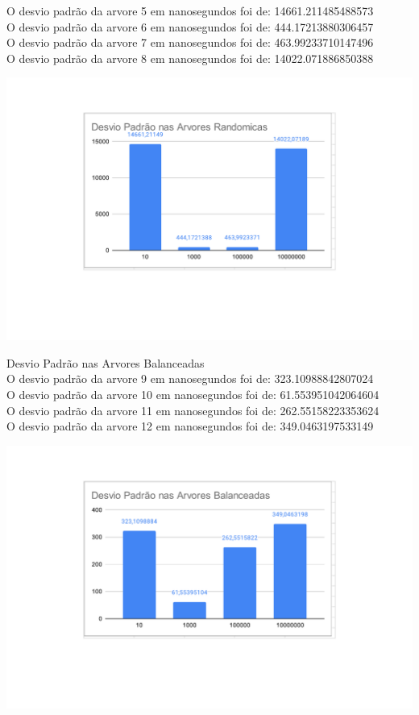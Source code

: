 O desvio padrão da arvore 5 em nanosegundos foi de: 14661.211485488573\\
O desvio padrão da arvore 6 em nanosegundos foi de: 444.17213880306457\\
O desvio padrão da arvore 7 em nanosegundos foi de: 463.99233710147496\\
O desvio padrão da arvore 8 em nanosegundos foi de: 14022.071886850388
    \begin{center}
            \includegraphics[scale=0.8]{Trabalho AED/fig/grafico9.pdf}
            \label{fig:Grafico 9}
    \end{center}
\pagebreak
Desvio Padrão nas Arvores Balanceadas\\
O desvio padrão da arvore 9 em nanosegundos foi de: 323.10988842807024\\
O desvio padrão da arvore 10 em nanosegundos foi de: 61.553951042064604\\
O desvio padrão da arvore 11 em nanosegundos foi de: 262.55158223353624\\
O desvio padrão da arvore 12 em nanosegundos foi de: 349.0463197533149
    \begin{center}
            \includegraphics[scale=0.8]{Trabalho AED/fig/grafico10.pdf}
            \label{fig:Grafico 10}
    \end{center}